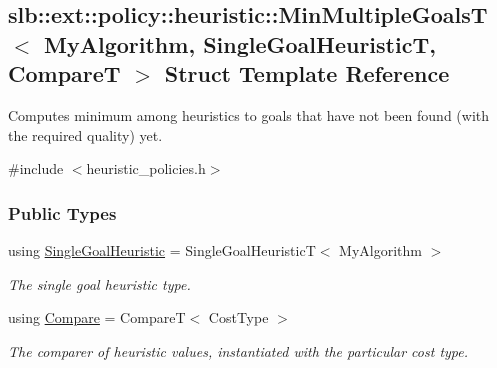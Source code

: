 \hypertarget{structslb_1_1ext_1_1policy_1_1heuristic_1_1MinMultipleGoalsT}{}\subsection{slb\+:\+:ext\+:\+:policy\+:\+:heuristic\+:\+:Min\+Multiple\+GoalsT$<$ My\+Algorithm, Single\+Goal\+HeuristicT, CompareT $>$ Struct Template Reference}
\label{structslb_1_1ext_1_1policy_1_1heuristic_1_1MinMultipleGoalsT}


Computes minimum among heuristics to goals that have not been found (with the required quality) yet.  




{\ttfamily \#include $<$heuristic\+\_\+policies.\+h$>$}

\subsubsection*{Public Types}
\begin{DoxyCompactItemize}
\item 
using \hyperlink{structslb_1_1ext_1_1policy_1_1heuristic_1_1MinMultipleGoalsT_ae0deabd1bd117ed3fdbb2f0859d0efb6}{Single\+Goal\+Heuristic} = Single\+Goal\+HeuristicT$<$ My\+Algorithm $>$\hypertarget{structslb_1_1ext_1_1policy_1_1heuristic_1_1MinMultipleGoalsT_ae0deabd1bd117ed3fdbb2f0859d0efb6}{}\label{structslb_1_1ext_1_1policy_1_1heuristic_1_1MinMultipleGoalsT_ae0deabd1bd117ed3fdbb2f0859d0efb6}

\begin{DoxyCompactList}\small\item\em The single goal heuristic type. \end{DoxyCompactList}\item 
using \hyperlink{structslb_1_1ext_1_1policy_1_1heuristic_1_1MinMultipleGoalsT_ab3927fe6fcb6244f22c75357df3fd4e6}{Compare} = CompareT$<$ Cost\+Type $>$\hypertarget{structslb_1_1ext_1_1policy_1_1heuristic_1_1MinMultipleGoalsT_ab3927fe6fcb6244f22c75357df3fd4e6}{}\label{structslb_1_1ext_1_1policy_1_1heuristic_1_1MinMultipleGoalsT_ab3927fe6fcb6244f22c75357df3fd4e6}

\begin{DoxyCompactList}\small\item\em The comparer of heuristic values, instantiated with the particular cost type. \end{DoxyCompactList}\end{DoxyCompactItemize}
